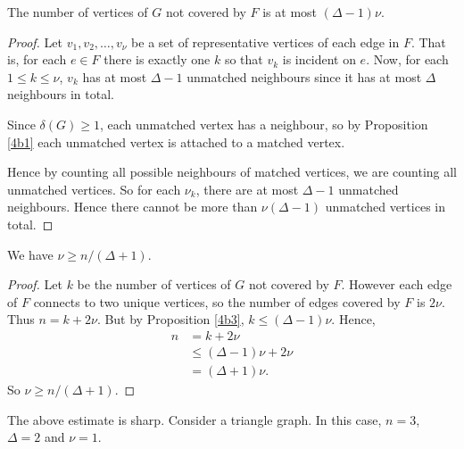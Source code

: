 \documentclass{unswmaths}
\begin{document}
\begin{proposition}
\label{4b3}
The number of vertices of $G$ not covered by $F$ is at most $(\Delta-1)\nu$.
\end{proposition}
\begin{proof}
    Let $v_1,v_2,\ldots,v_\nu$ be a set of representative vertices
    of each edge in $F$. That is, for each $e \in F$ there
    is exactly one $k$ so that $v_k$ is incident on $e$. 
    Now, for each $1 \leq k \leq \nu$, $v_k$ has at most $\Delta - 1$
    unmatched neighbours since it has at most $\Delta$ neighbours in total.    
    
    Since $\delta(G) \geq 1$, each unmatched vertex has a neighbour,
    so by Proposition \ref{4b1} each unmatched vertex is attached to a matched
    vertex.
    
    Hence by counting all possible neighbours of matched vertices, we are
    counting all unmatched vertices. So for each $\nu_k$, there
    are at most $\Delta-1$ unmatched neighbours. Hence there cannot
    be more than $\nu(\Delta - 1)$ unmatched vertices in total.    
\end{proof}
\begin{proposition}[Part (b) iv]
\label{4b4}
We have $\nu \geq n/(\Delta+1)$.
\end{proposition}
\begin{proof}
    Let $k$ be the number of vertices of $G$ not covered by $F$.
    However each edge of $F$ connects to two unique vertices, so the number
    of edges covered by $F$ is $2\nu$.
    Thus
    $n = k+2\nu$. But by Proposition \ref{4b3}, $k \leq (\Delta-1)\nu$.
    Hence,
    \begin{align}
        n &= k+2\nu\\
        &\leq (\Delta-1)\nu+2\nu\\
        &= (\Delta+1)\nu.
    \end{align}
    So $\nu \geq n/(\Delta+1)$.
\end{proof}

\begin{remark}
    The above estimate is sharp. Consider a triangle graph. 
    In this case, $n = 3$, $\Delta = 2$ and $\nu = 1$.
\end{remark}
\end{document}
